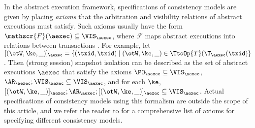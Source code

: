 In the abstract execution framework, specifications of consistency models are given by placing \emph{axioms} that the 
arbitration and visibility relations of abstract executions must satisfy. Such axioms usually 
have the form $\mathscr{F}(\aexec) \subseteq \VIS_{\aexec}$, 
where $\mathscr{F}$ maps abstract executions into relations between transactions \cite{laws}. 
For example, let $[(\otW, \ke, \_)]_{\aexec} = \{(\txid, \txid) \mid (\otW, \ke, \_) \in \TtoOp{T}(\T_{\aexec}(\txid) \}$. 
Then (strong session) snapshot isolation can be described as the set of abstract executions $\aexec$ that 
satisfy the axioms $\PO_{\aexec} \subseteq \VIS_{\aexec}$, $\AR_{\aexec} ; \VIS_{\aexec} \subseteq \VIS_{\aexec}$, 
and for each $\ke$, $[(\otW, \ke, \_)]_{\aexec} ; \AR_{\aexec} ; [(\otW, \ke, \_)]_{\aexec} \subseteq \VIS_{\aexec}$. 
Actual specifications of consistency models using this formalism are outside the scope of this article, and we 
refer the reader to \cite{laws} for a comprehensive list of axioms for specifying different consistency models.

